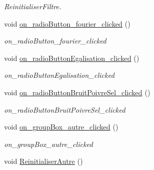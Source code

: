 \begin{DoxyCompactItemize}
\begin{DoxyCompactList}\small\item\em Reinitialiser\+Filtre. \end{DoxyCompactList}\item 
\mbox{\label{classAppMainWindow_a24bf70c60990d01703a33a31eb1752dd}} 
void \hyperlink{classAppMainWindow_a24bf70c60990d01703a33a31eb1752dd}{on\+\_\+radio\+Button\+\_\+fourier\+\_\+clicked} ()
\begin{DoxyCompactList}\small\item\em on\+\_\+radio\+Button\+\_\+fourier\+\_\+clicked \end{DoxyCompactList}\item 
\mbox{\label{classAppMainWindow_a8419541ba5ae0a3b6c3fd22ea6bae9e7}} 
void \hyperlink{classAppMainWindow_a8419541ba5ae0a3b6c3fd22ea6bae9e7}{on\+\_\+radio\+Button\+Egalisation\+\_\+clicked} ()
\begin{DoxyCompactList}\small\item\em on\+\_\+radio\+Button\+Egalisation\+\_\+clicked \end{DoxyCompactList}\item 
\mbox{\label{classAppMainWindow_acb9f23df78b12a12327edf6f142eb94b}} 
void \hyperlink{classAppMainWindow_acb9f23df78b12a12327edf6f142eb94b}{on\+\_\+radio\+Button\+Bruit\+Poivre\+Sel\+\_\+clicked} ()
\begin{DoxyCompactList}\small\item\em on\+\_\+radio\+Button\+Bruit\+Poivre\+Sel\+\_\+clicked \end{DoxyCompactList}\item 
\mbox{\label{classAppMainWindow_a3dc765a8f2a057a01d2f9dccbb3dd6a5}} 
void \hyperlink{classAppMainWindow_a3dc765a8f2a057a01d2f9dccbb3dd6a5}{on\+\_\+group\+Box\+\_\+autre\+\_\+clicked} ()
\begin{DoxyCompactList}\small\item\em on\+\_\+group\+Box\+\_\+autre\+\_\+clicked \end{DoxyCompactList}\item 
\mbox{\label{classAppMainWindow_ac00492d93c1a483eecb866f7db2a363c}} 
void \hyperlink{classAppMainWindow_ac00492d93c1a483eecb866f7db2a363c}{Reinitialiser\+Autre} ()

\end{DoxyCompactItemize}
